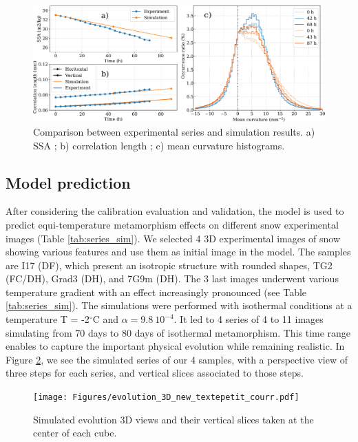 \documentclass[draft,ms]{agujournal2019}
\begin{document}
\begin{figure}
    \centering
    \includegraphics[width=\linewidth]{Figures/eboni_courbes_lc_ssa_histo.pdf}
    \caption{Comparison between \protect{} experimental series and simulation results. a) SSA ; b) correlation length ; c) mean curvature histograms.}
    \label{fig:eboni}
\end{figure}


\subsection{Model prediction}
\label{sec:prediction}

After considering the calibration evaluation and validation, the model is used to predict equi-temperature metamorphism effects on different snow experimental images (Table \ref{tab:series_sim}). We selected 4 3D experimental images of snow showing various features and use them as initial image in the model. The samples are I17 (DF), which present an isotropic structure with rounded shapes, TG2 (FC/DH), Grad3 (DH), and 7G9m (DH). The 3 last images underwent various temperature gradient with an effect increasingly pronounced (see Table \ref{tab:series_sim}). The simulations were performed with isothermal conditions at a temperature T = -2$^\circ$C and $\alpha = 9.8\ 10^{-4}$. It led to 4 series of 4 to 11 images simulating from 70 days to 80 days of isothermal metamorphism. This time range enables to capture the important physical evolution while remaining realistic. In Figure \ref{fig:evolutions_3D}, we see the simulated series of our 4 samples, with a perspective view of three steps for each series, and vertical slices associated to those steps.\\

\begin{figure}
    \centering
    \texttt{[image: Figures/evolution\_3D\_new\_textepetit\_courr.pdf]}
    \caption{Simulated evolution 3D views and their vertical slices taken at the center of each cube.}
    \label{fig:evolutions_3D}
\end{figure}
\end{document}
